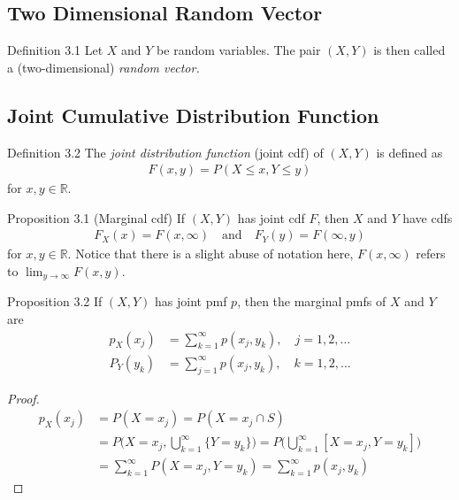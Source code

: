 \subsection{Two Dimensional Random Vector}
\begin{boks}{Definition 3.1}
Let $X$ and $Y$ be random variables. The pair $(X,Y)$ is then called a (two-dimensional) \textit{random vector.}
\end{boks}

\subsection{Joint Cumulative Distribution Function}
\begin{boks}{Definition 3.2}
The \textit{joint distribution function} (joint cdf) of $(X,Y)$ is defined as
\begin{align*}
    F(x,y) = P(X \leq x, Y \leq y)
\end{align*}
for $x,y \in \mathbb{R}$.
\end{boks}

\begin{boks}{Proposition 3.1 (Marginal cdf)}
If $(X, Y)$ has joint cdf $F$, then $X$ and $Y$ have cdfs
\begin{align*}
    F_X(x) = F(x, \infty) \quad \text{and} \quad F_Y(y) = F(\infty, y)
\end{align*}
for $x,y \in \mathbb{R}$. Notice that there is a slight abuse of notation here, $F(x,\infty)$ refers to $\lim_{y \rightarrow \infty} F(x, y)$.
\end{boks}

\begin{boks}{Proposition 3.2}
  If $(X, Y)$ has joint pmf $p$, then the marginal pmfs of $X$ and $Y$ are
  \begin{align*}
    p_X(x_j) &= \sum_{k = 1}^\infty p(x_j, y_k), \quad j = 1, 2, \ldots \\
    P_Y(y_k) &= \sum_{j = 1}^\infty p(x_j, y_k), \quad k = 1, 2, \ldots
  \end{align*}
\end{boks}
\begin{proof}
  \begin{align*}
    p_X(x_j)  &= P(X = x_j) = P(X = x_j \cap S) \\
              &= P\bigg(X = x_j, \bigcup_{k = 1}^\infty \{Y = y_k\}\bigg) =
              P\bigg( \bigcup_{k = 1}^\infty [X = x_j, Y = y_k] \bigg) \\
              &= \sum_{k = 1}^{\infty} P(X = x_j, Y = y_k) = \sum_{k = 1}^\infty p(x_j, y_k)
  \end{align*}
\end{proof}

